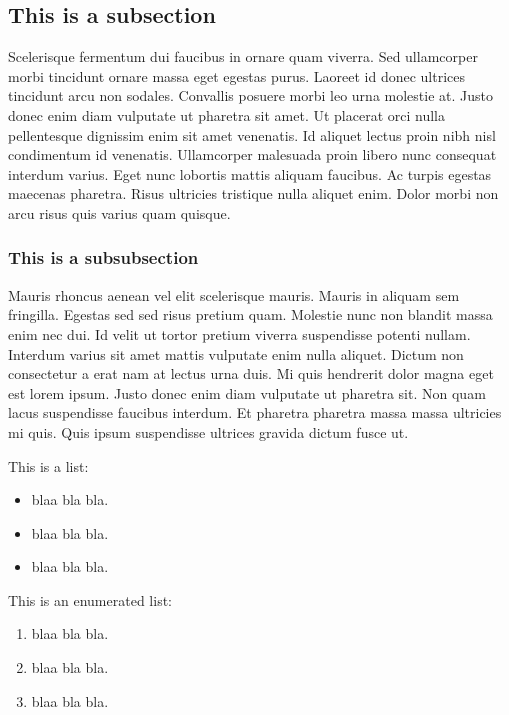     \subsection{This is a subsection}

    Scelerisque fermentum dui faucibus in ornare quam viverra. Sed ullamcorper morbi tincidunt ornare massa eget egestas purus. Laoreet id donec ultrices tincidunt arcu non sodales. Convallis posuere morbi leo urna molestie at. Justo donec enim diam vulputate ut pharetra sit amet. Ut placerat orci nulla pellentesque dignissim enim sit amet venenatis. Id aliquet lectus proin nibh nisl condimentum id venenatis. Ullamcorper malesuada proin libero nunc consequat interdum varius. Eget nunc lobortis mattis aliquam faucibus. Ac turpis egestas maecenas pharetra. Risus ultricies tristique nulla aliquet enim. Dolor morbi non arcu risus quis varius quam quisque.

        \subsubsection{This is a subsubsection}


        Mauris rhoncus aenean \cite{brooke1996sus} vel elit scelerisque mauris. Mauris in aliquam sem fringilla. Egestas sed sed risus pretium quam. Molestie nunc non blandit massa enim nec dui. Id velit ut tortor pretium viverra suspendisse potenti nullam. Interdum varius sit amet mattis vulputate enim nulla aliquet. Dictum non consectetur a erat nam at lectus urna duis. Mi quis hendrerit dolor magna eget est lorem ipsum. Justo donec enim diam vulputate ut pharetra sit. Non quam lacus suspendisse faucibus interdum. Et pharetra pharetra massa massa ultricies mi quis. Quis ipsum suspendisse ultrices gravida dictum fusce ut.

    
    
    This is a list:\par
     
    \begin{itemize}
        \item blaa bla bla.
        \item blaa bla bla.
        \item blaa bla bla.
    \end{itemize}

    This is an enumerated list:
    \begin{enumerate}
        \item blaa bla bla.
        \item blaa bla bla.
        \item blaa bla bla.
    \end{enumerate}